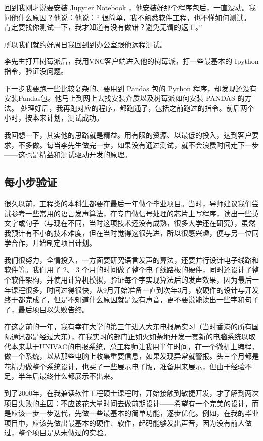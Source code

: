 回到我刚才说要安装 Jupyter Notebook
，他安装好那个程序包后，一直没动。我问他什么原因？他说：他说：``
很简单，我不熟悉软件工程，也不懂如何测试。
肯定要找你测试一下，我才知道有没有做错？避免无谓的返工。''

所以我们就约好周日我回到到办公室跟他远程测试。

李先生打开树莓派后，我用VNC客户端进入他的树莓派，打一些最基本的 Ipython
指令，验证没问题。

下一步我要跑一些比较复杂的、要用到 Pandas 包的 Python
程序，却发现还没有安装Pandas包。他马上到网上去找安装介质以及树莓派如何安装
PANDAS 的方法。
处理好后，我再跑对应的程序，都跑通了，包括之前跑过的指令。前后两个小时，按本来计划，测试成功。

我回想一下，其实他的思路就是精益。用有限的资源、以最低的投入，达到客户要求，不多做。每当李先生做完一步，如果没有通过测试，就不会浪费时间走下一步------这也是精益和测试驱动开发的原理。

\hypertarget{ux6bcfux5c0fux6b65ux9a8cux8bc1}{%
\subsection{每小步验证}\label{ux6bcfux5c0fux6b65ux9a8cux8bc1}}

很久以前，工程类的本科生都要在最后一年做个毕业项目。当时，导师建议我们尝试参考一些常用的语言发声算法，在专门做信号处理的芯片上写程序，读出一些英文字或句子（与现在不同，当时这项技术还没有成熟，很多大学还在研究），虽然我预计有不小的技术难度，但在当时觉得这很先进，所以很感兴趣，便与另一位同学合作，开始制定项目计划。

我们很努力，全情投入，一方面要研究语言发声的算法，还要并行设计电子线路和软件等。我们用了
2、 3
个月的时间做了整个电子线路板的硬件，同时还设计了整个软件架构，并使用计算机模拟，验证每个字实现算法后的发声效果，因为最后一年课程很多，时间过得很快，从9月开始准备一直到次年3月，软硬件的设计与开发终于都完成了，但是不知道什么原因就是没有声音，更不要说能读出一些字和句子了，最后项目以失败告终。

在这之前的一年，我有幸在大学的第三年进入大东电报局实习（当时香港的所有国际通讯都是经过大东），在我实习的部门正如火如荼地开发一套新的电脑系统以取代本来基于UNIVAC的电报系统，总工程师让我用半年时间，在一个微机上编程，做一个系统，以从那些电脑上收集重要信息，如果发现异常就警报。头三个月都是花精力做整个系统设计，也买了一些展示电子版，准备用来展示，但由于经验不足，半年后最终什么都展示不出来。

到了2000年，在我兼读软件工程硕士课程时，开始接触到敏捷开发，才了解到两次项目失败的主因：不应该花大量时间去做前期设计------希望有一个完美的设计，而是应该一步一步迭代，先做一些最基本的简单功能，逐步优化。例如，在我的毕业项目中，应该先做出最基本的硬件、软件，起码能够发出声音，因为没有前人做过，整个项目是从未做过的实验。

